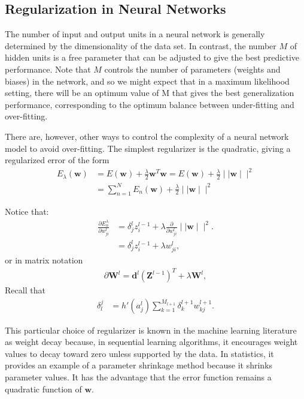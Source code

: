\documentclass{tufte-handout}
\begin{document}
\subsection{Regularization in Neural Networks }

The number of input and output units in a neural network  is generally determined by the dimensionality of the data set. In contrast, the number $M$ of hidden units is a free parameter that can be adjusted to give the best predictive performance. Note that $M$ controls the number of parameters (weights and biases) in the network, and so we might expect that in a maximum likelihood setting, there will be an optimum value of M that gives the best generalization performance, corresponding to the optimum balance between under-fitting and over-fitting.

There are, however, other ways to control the complexity of a neural network model to avoid over-fitting.
The simplest regularizer is the quadratic, giving a regularized error of the form
\begin{align*}
E_\lambda( \mathbf w) &= E(\mathbf w) + \frac{\lambda}{2} \mathbf w^T \mathbf w= E(\mathbf w) + \frac{\lambda}{2} 
\mid\mid \mathbf w\mid\mid^2\\
&= \sum_{n=1}^N E_n(\mathbf w) + \frac{\lambda}{2} 
\mid\mid \mathbf w\mid\mid^2
\end{align*}

Notice that:
\begin{align*}
\frac{\partial E_n^\lambda}{\partial w_{ji}^l} &= \delta_{j}^lz_i^{l-1} + \lambda  \frac{\partial}{\partial w_{ji}^l} \mid\mid \mathbf w\mid\mid^2.\\
&= \delta_{j}^lz_i^{l-1} + \lambda w_{ji}^l,
\end{align*}
or in matrix notation
\begin{align*}
\partial \mathbf W^l = \mathbf d^l ( \mathbf Z^{l-1})^T + \lambda \mathbf W^l,
\end{align*}
Recall that
\begin{align*}
\delta^j_l&= h'(a_j^l) \sum_{k=1}^{M_{l+1}} \delta_{k}^{l+1} w_{kj}^{l+1}.
\end{align*}

This particular choice of regularizer is known in the machine learning literature as weight decay because, in sequential learning algorithms, it encourages weight values to decay toward zero unless supported by the data. In statistics, it provides an example of a parameter shrinkage method because it shrinks parameter values. It has the advantage that the error function remains a quadratic function of $\mathbf w$. 
\end{document}
